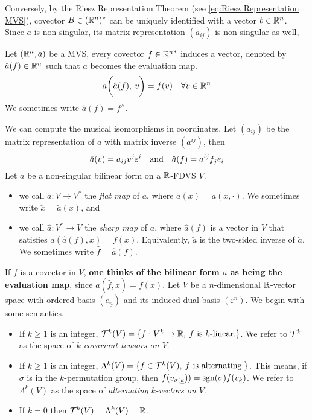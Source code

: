 \documentclass[../main-v2-manifolds.tex]{subfiles}
\begin{document}
Conversely, by the Riesz Representation Theorem (see \cref{eq:Riesz Representation MVS}), covector $B\in({\mathbb{R}^n})^*$ can be uniquely identified with a vector $b\in{\mathbb{R}^n}$. Since $a$ is non-singular, its matrix representation $(a_{ij})$ is non-singular as well,
\begin{definition}
    Let $({\mathbb{R}^n},a)$ be a MVS, every covector $f\in {\mathbb{R}^n}^*$ induces a vector, denoted by $\hat{a}(f)\in {\mathbb{R}^n}$ such that $a$ becomes the evaluation map.
    \begin{equation}
        a\biggl(\hat{a}(f),\: v\biggr)=f(v)\quad\forall v\in{\mathbb{R}^n}
        \label{eq:musical isomorphism sharpen}
    \end{equation}
    We sometimes write $\hat{a}(f) = f^{\wedge}$.
\end{definition}
We can compute the musical isomorphisms in coordinates. Let $(a_{ij})$ be the matrix representation of $a$ with matrix inverse $(a^{ij})$, then 
\[
    \breve{a}(v)=a_{ij}v^j\varepsilon^i\qqtext{and}\hat{a}(f) = a^{ij}f_j e_i
\]
%
%
%
Let $a$ be a non-singular bilinear form on a $\mathbb{R}$-FDVS $V$.
\begin{itemize}
    \item we call $\breve{a}: V\to V^*$ the \emph{flat map} of $a$, where $\breve{a}(x) = a(x,\cdot)$. We sometimes write $\breve{x} = \breve{a}(x)$, and 
    \item we call $\hat{a}: V^*\to V$ the \emph{sharp map} of $a$, where $\hat{a}(f)$ is a vector in $V$ that satisfies $a(\hat{a}(f), x) = f(x)$. Equivalently, $\breve{a}$ is the two-sided inverse of $\breve{a}$. We sometimes write $\hat{f} = \hat{a}(f)$.
\end{itemize}
If $f$ is a covector in $V$, \textbf{one thinks of the bilinear form $a$ as being the evaluation map}, since $a(\hat{f},x) = f(x)$.
Let $V$ be a $n$-dimensional $\mathbb{R}$-vector space with ordered basis $(e_{\underline{n}})$ and its induced dual basis $(\varepsilon^{\underline{n}})$. We begin with some semantics.
\begin{itemize}
    \item If $k\geq 1$ is an integer, $\mathcal{T}^k(V) = \{f: V^k\to\mathbb{R},\: f\text{ is }k\text{-linear.}\}$. We refer to $\mathcal{T}^k$ as the space of \emph{$k$-covariant tensors on $V$}.
    \item If $k\geq 1$ is an integer, $\Lambda^k(V) = \{f\in \mathcal{T}^k(V),\: f\text{ is alternating.}\}$. This means, if $\sigma$ is in the $k$-permutation group, then $f(v_{\sigma(\underline{k}})) = \operatorname{sgn}(\sigma)f(v_{\underline{k}})$. We refer to $\Lambda^k(V)$ as the space of \emph{alternating $k$-vectors on $V$}.
    \item If $k=0$ then $\mathcal{T}^k(V) = \Lambda^k(V) =\mathbb{R}$.
\end{itemize}
\end{document}
